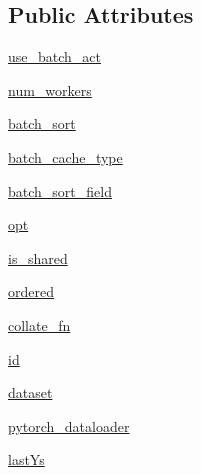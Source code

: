 \subsection*{Public Attributes}
\begin{DoxyCompactItemize}
\item 
\hyperlink{classparlai_1_1core_1_1pytorch__data__teacher_1_1PytorchDataTeacher_ab332dd1715cc19c97b5dfbe69815cdcc}{use\+\_\+batch\+\_\+act}
\item 
\hyperlink{classparlai_1_1core_1_1pytorch__data__teacher_1_1PytorchDataTeacher_ab4c3c189f7841cf9fd3b3ab9971d323a}{num\+\_\+workers}
\item 
\hyperlink{classparlai_1_1core_1_1pytorch__data__teacher_1_1PytorchDataTeacher_a4490d10b63293db24fa778266f19724e}{batch\+\_\+sort}
\item 
\hyperlink{classparlai_1_1core_1_1pytorch__data__teacher_1_1PytorchDataTeacher_a9f81bda095f7e436d6dc1701a3db70e4}{batch\+\_\+cache\+\_\+type}
\item 
\hyperlink{classparlai_1_1core_1_1pytorch__data__teacher_1_1PytorchDataTeacher_a9c13721c89ae240e06e1f48f58dcf0a9}{batch\+\_\+sort\+\_\+field}
\item 
\hyperlink{classparlai_1_1core_1_1pytorch__data__teacher_1_1PytorchDataTeacher_abe4c778c23a027a215941e6def84bae0}{opt}
\item 
\hyperlink{classparlai_1_1core_1_1pytorch__data__teacher_1_1PytorchDataTeacher_aff448551abdd88ed6a029bc2a30f1877}{is\+\_\+shared}
\item 
\hyperlink{classparlai_1_1core_1_1pytorch__data__teacher_1_1PytorchDataTeacher_aff478e66a2fd8a32d8100da4d2d1cf71}{ordered}
\item 
\hyperlink{classparlai_1_1core_1_1pytorch__data__teacher_1_1PytorchDataTeacher_ac13950d75386509992759d1c97048a84}{collate\+\_\+fn}
\item 
\hyperlink{classparlai_1_1core_1_1pytorch__data__teacher_1_1PytorchDataTeacher_a02d5ad126f990d4fbe4c1140fe3e73d8}{id}
\item 
\hyperlink{classparlai_1_1core_1_1pytorch__data__teacher_1_1PytorchDataTeacher_abb5fcddd3183cbaa39ed9ba072155331}{dataset}
\item 
\hyperlink{classparlai_1_1core_1_1pytorch__data__teacher_1_1PytorchDataTeacher_a110935dac0f8f802327ee6879f9aebe5}{pytorch\+\_\+dataloader}
\item 
\hyperlink{classparlai_1_1core_1_1pytorch__data__teacher_1_1PytorchDataTeacher_af87f024eaa939b44cdcab43a651edf8e}{last\+Ys}
\item 

\end{DoxyCompactItemize}
